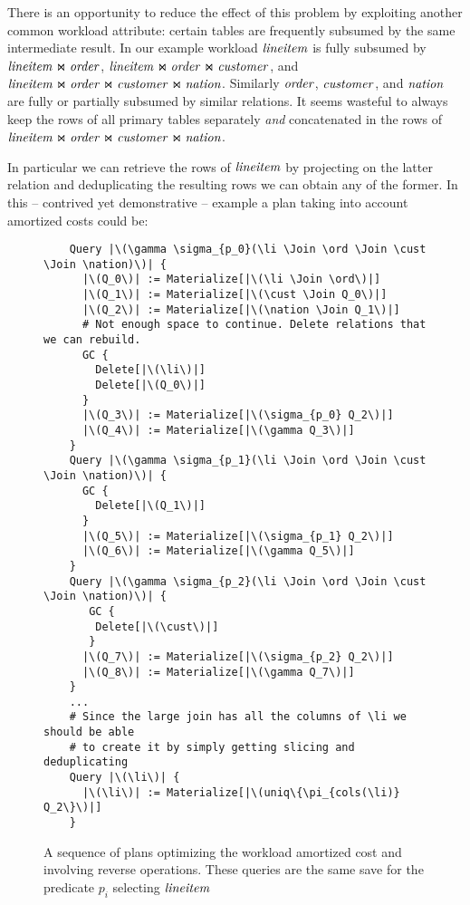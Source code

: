There is an opportunity to reduce the effect of this problem by
exploiting another common workload attribute: certain tables are
frequently subsumed by the same intermediate result. In our example
workload \(\mathit{lineitem}\) is fully subsumed by \(\mathit{lineitem} \Join \mathit{order}\), \(\mathit{lineitem} \Join
\mathit{order} \Join \mathit{customer}\), and \(\mathit{lineitem} \Join \mathit{order} \Join \mathit{customer} \Join
\mathit{nation}\). Similarly \(\mathit{order}\), \(\mathit{customer}\), and \(\mathit{nation}\) are fully or
partially subsumed by similar relations. It seems wasteful to always
keep the rows of all primary tables separately \emph{and} concatenated
in the rows of \(\mathit{lineitem} \Join \mathit{order} \Join \mathit{customer} \Join \mathit{nation}\).

In particular we can retrieve the rows of \(\mathit{lineitem}\) by projecting
on the latter relation and deduplicating the resulting rows we can
obtain any of the former. In this -- contrived yet demonstrative --
example a plan taking into account amortized costs could be:

\begin{figure}[H]
\begin{verbatim}
    Query |\(\gamma \sigma_{p_0}(\li \Join \ord \Join \cust \Join \nation)\)| {
      |\(Q_0\)| := Materialize[|\(\li \Join \ord\)|]
      |\(Q_1\)| := Materialize[|\(\cust \Join Q_0\)|]
      |\(Q_2\)| := Materialize[|\(\nation \Join Q_1\)|]
      # Not enough space to continue. Delete relations that we can rebuild.
      GC {
        Delete[|\(\li\)|]
        Delete[|\(Q_0\)|]
      }
      |\(Q_3\)| := Materialize[|\(\sigma_{p_0} Q_2\)|]
      |\(Q_4\)| := Materialize[|\(\gamma Q_3\)|]
    }
    Query |\(\gamma \sigma_{p_1}(\li \Join \ord \Join \cust \Join \nation)\)| {
      GC {
        Delete[|\(Q_1\)|]
      }
      |\(Q_5\)| := Materialize[|\(\sigma_{p_1} Q_2\)|]
      |\(Q_6\)| := Materialize[|\(\gamma Q_5\)|]
    }
    Query |\(\gamma \sigma_{p_2}(\li \Join \ord \Join \cust \Join \nation)\)| {
       GC {
        Delete[|\(\cust\)|]
       }
      |\(Q_7\)| := Materialize[|\(\sigma_{p_2} Q_2\)|]
      |\(Q_8\)| := Materialize[|\(\gamma Q_7\)|]
    }
    ...
    # Since the large join has all the columns of \li we should be able
    # to create it by simply getting slicing and deduplicating
    Query |\(\li\)| {
      |\(\li\)| := Materialize[|\(uniq\{\pi_{cols(\li)} Q_2\}\)|]
    }
\end{verbatim}
  \caption{\label{fig:amortized_plan}A sequence of plans optimizing
    the workload amortized cost and involving reverse
    operations. These queries are the same save for the predicate
    \(p_i\) selecting \(\mathit{lineitem}\)}
\end{figure}

